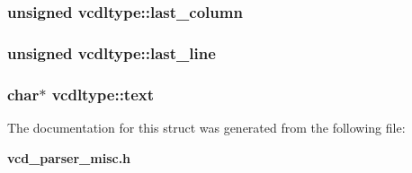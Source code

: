 \subsubsection{\setlength{\rightskip}{0pt plus 5cm}unsigned vcdltype::last\_\-column}\label{structvcdltype_m3}


\subsubsection{\setlength{\rightskip}{0pt plus 5cm}unsigned vcdltype::last\_\-line}\label{structvcdltype_m2}


\subsubsection{\setlength{\rightskip}{0pt plus 5cm}char$\ast$ vcdltype::text}\label{structvcdltype_m4}




The documentation for this struct was generated from the following file:\begin{CompactItemize}
\item 
{\bf vcd\_\-parser\_\-misc.h}\end{CompactItemize}
